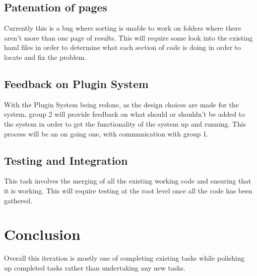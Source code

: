 \documentclass{article}
\begin{document}
\subsection{Patenation of pages}

Currently this is a bug where sorting is unable to work on folders where there aren't more than one page of results. This will require some look into the existing haml files in order to determine what each section of code is doing in order to locate and fix the problem.

\subsection{Feedback on Plugin System}

With the Plugin System being redone, as the design choices are made for the system, group 2 will provide feedback on what should or shouldn't be added to the system in order to get the functionality of the system up and running. This process will be an on going one, with communication with group 1.

\subsection{Testing and Integration}

This task involves the merging of all the existing working code and ensuring that it is working. This will require testing at the root level once all the code has been gathered.

\section{Conclusion}

Overall this iteration is mostly one of completing existing tasks while polishing up completed tasks rather than undertaking any new tasks.
\end{document}
